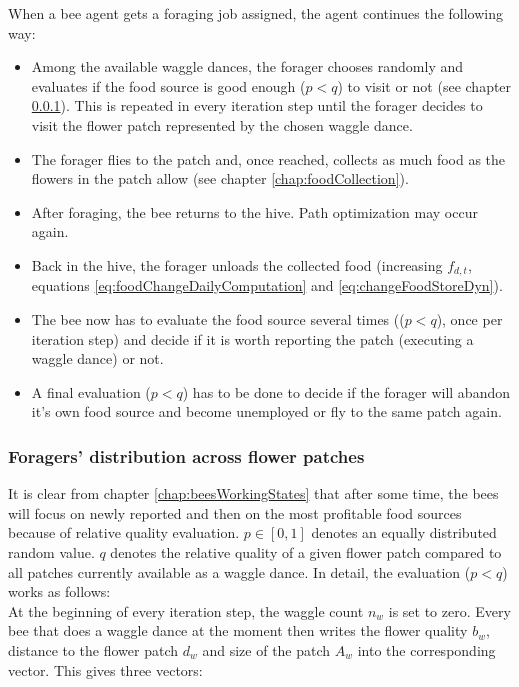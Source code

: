 			When a bee agent gets a foraging job assigned, the agent continues the following way:
			\begin{itemize}
				\item Among the available waggle dances, the forager chooses randomly and evaluates if the food source is good enough ($p < q$) to visit or not (see chapter \ref{chap:foragersDistribution}). This is repeated in every iteration step until the forager decides to visit the flower patch represented by the chosen waggle dance.
				\item The forager flies to the patch and, once reached, collects as much food as the flowers in the patch allow (see chapter \ref{chap:foodCollection}).
				\item After foraging, the bee returns to the hive. Path optimization may occur again.
				\item Back in the hive, the forager unloads the collected food (increasing $f_{d,t}$, equations \ref{eq:foodChangeDailyComputation} and \ref{eq:changeFoodStoreDyn}).
				\item The bee now has to evaluate the food source several times (($p < q$), once per iteration step) and decide if it is worth reporting the patch (executing a waggle dance) or not.
				\item A final evaluation ($p < q$) has to be done to decide if the forager will abandon it's own food source and become unemployed or fly to the same patch again.
			\end{itemize}
	
		
		\subsubsection{Foragers' distribution across flower patches}
			\label{chap:foragersDistribution}
			It is clear from chapter \ref{chap:beesWorkingStates} that after some time, the bees will focus on newly reported and then on the most profitable food sources because of relative quality evaluation. $p \in {[0,1]}$ denotes an equally distributed random value. $q$ denotes the relative quality of a given flower patch compared to all patches currently available as a waggle dance. In detail, the evaluation ($p < q$) works as follows:\\
			
			At the beginning of every iteration step, the waggle count $n_w$ is set to zero. Every bee that does a waggle dance at the moment then writes the flower quality $b_w$, distance to the flower patch $d_w$ and size of the patch $A_w$ into the corresponding vector. This gives three vectors:
			
